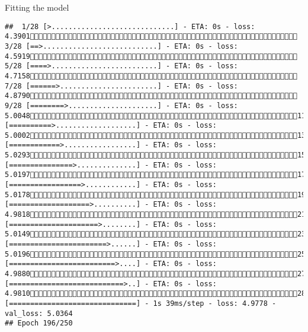 \documentclass[
  ignorenonframetext,
]{beamer}
\begin{document}
\begin{frame}[fragile]{Fitting the model}
\begin{verbatim}
##  1/28 [>.............................] - ETA: 0s - loss: 4.3901 3/28 [==>...........................] - ETA: 0s - loss: 4.5919 5/28 [====>.........................] - ETA: 0s - loss: 4.7158 7/28 [======>.......................] - ETA: 0s - loss: 4.8790 9/28 [========>.....................] - ETA: 0s - loss: 5.004811/28 [==========>...................] - ETA: 0s - loss: 5.000213/28 [============>.................] - ETA: 0s - loss: 5.029315/28 [===============>..............] - ETA: 0s - loss: 5.019717/28 [=================>............] - ETA: 0s - loss: 5.017819/28 [===================>..........] - ETA: 0s - loss: 4.981821/28 [=====================>........] - ETA: 0s - loss: 5.014923/28 [=======================>......] - ETA: 0s - loss: 5.019625/28 [=========================>....] - ETA: 0s - loss: 4.988027/28 [===========================>..] - ETA: 0s - loss: 4.981028/28 [==============================] - 1s 39ms/step - loss: 4.9778 - val_loss: 5.0364
## Epoch 196/250

\end{verbatim}
\end{frame}
\end{document}
